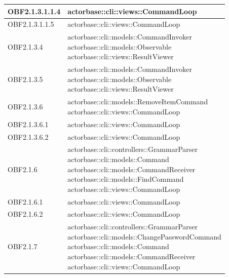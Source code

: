 \documentclass{scalatekids-article}
\begin{document}
\begin{longtable}[H]{|p{4.5cm}|p{13cm}|}
  OBF2.1.3.1.1.4 & \multiLineCell[t]{actorbase::cli::views::CommandLoop\\}\\
  \hline
  OBF2.1.3.1.1.5 & \multiLineCell[t]{actorbase::cli::views::CommandLoop\\}\\
  \hline
  OBF2.1.3.4 & \multiLineCell[t]{actorbase::cli::models::CommandInvoker\\actorbase::cli::models::Observable\\actorbase::cli::views::ResultViewer\\}\\
  \hline
  OBF2.1.3.5 & \multiLineCell[t]{actorbase::cli::models::CommandInvoker\\actorbase::cli::models::Observable\\actorbase::cli::views::ResultViewer\\}\\
  \hline
  OBF2.1.3.6 & \multiLineCell[t]{actorbase::cli::models::RemoveItemCommand\\actorbase::cli::views::CommandLoop\\}\\
  \hline
  OBF2.1.3.6.1 & \multiLineCell[t]{actorbase::cli::views::CommandLoop\\}\\
  \hline
  OBF2.1.3.6.2 & \multiLineCell[t]{actorbase::cli::views::CommandLoop\\}\\
  \hline
  OBF2.1.6 & \multiLineCell[t]{actorbase::cli::controllers::GrammarParser\\actorbase::cli::models::Command\\actorbase::cli::models::CommandReceiver\\actorbase::cli::models::FindCommand\\actorbase::cli::views::CommandLoop\\}\\
  \hline
  OBF2.1.6.1 & \multiLineCell[t]{actorbase::cli::views::CommandLoop\\}\\
  \hline
  OBF2.1.6.2 & \multiLineCell[t]{actorbase::cli::views::CommandLoop\\}\\
  \hline
  OBF2.1.7 & \multiLineCell[t]{actorbase::cli::controllers::GrammarParser\\actorbase::cli::models::ChangePasswordCommand\\actorbase::cli::models::Command\\actorbase::cli::models::CommandReceiver\\actorbase::cli::views::CommandLoop\\}\\

\end{longtable}
\end{document}

